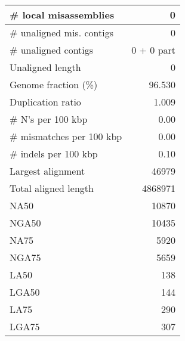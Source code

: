 \documentclass[12pt,a4paper]{article}
\begin{document}
\begin{table}[ht]
\begin{center}
\begin{tabular}{|l*{1}{|r}|}
\# local misassemblies & 0 \\ \hline
\# unaligned mis. contigs & 0 \\ \hline
\# unaligned contigs & 0 + 0 part \\ \hline
Unaligned length & 0 \\ \hline
Genome fraction (\%) & 96.530 \\ \hline
Duplication ratio & 1.009 \\ \hline
\# N's per 100 kbp & 0.00 \\ \hline
\# mismatches per 100 kbp & 0.00 \\ \hline
\# indels per 100 kbp & 0.10 \\ \hline
Largest alignment & 46979 \\ \hline
Total aligned length & 4868971 \\ \hline
NA50 & 10870 \\ \hline
NGA50 & 10435 \\ \hline
NA75 & 5920 \\ \hline
NGA75 & 5659 \\ \hline
LA50 & 138 \\ \hline
LGA50 & 144 \\ \hline
LA75 & 290 \\ \hline
LGA75 & 307 \\ \hline
\end{tabular}
\end{center}
\end{table}
\end{document}
